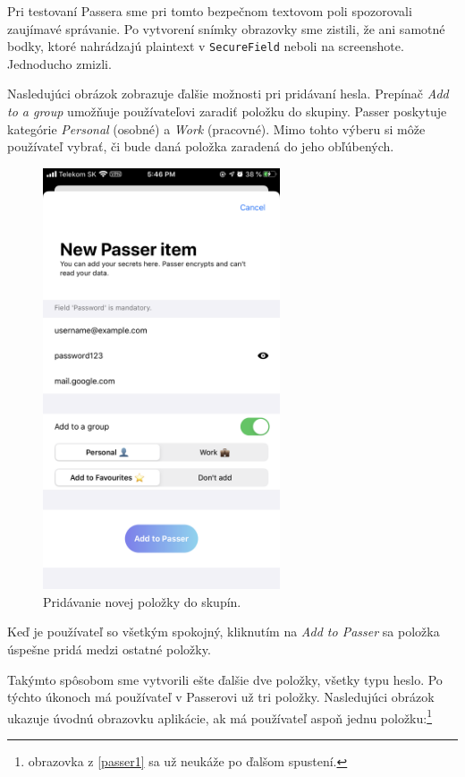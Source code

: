 Pri testovaní Passera sme pri tomto bezpečnom textovom poli spozorovali zaujímavé správanie. Po vytvorení snímky obrazovky sme zistili, že ani samotné bodky, ktoré nahrádzajú plaintext v \texttt{SecureField} neboli na screenshote. Jednoducho zmizli.

Nasledujúci obrázok zobrazuje ďalšie možnosti pri pridávaní hesla. Prepínač \textit{Add to a group} umožňuje používateľovi zaradiť položku do skupiny. Passer poskytuje kategórie \textit{Personal} (osobné) a \textit{Work} (pracovné). Mimo tohto výberu si môže používateľ vybrať, či bude daná položka zaradená do jeho obľúbených. 

\begin{figure}[H]
  \centering
  \includegraphics[width=7cm]{img/passer3.PNG}
  \caption{Pridávanie novej položky do skupín.}
  \label{passer3}
\end{figure}

Keď je používateľ so všetkým spokojný, kliknutím na \textit{Add to Passer} sa položka úspešne pridá medzi ostatné položky.

Takýmto spôsobom sme vytvorili ešte ďalšie dve položky, všetky typu heslo. Po týchto úkonoch má používateľ v Passerovi už tri položky. Nasledujúci obrázok ukazuje úvodnú obrazovku aplikácie, ak má používateľ aspoň jednu položku:\footnote{obrazovka z \figurename{ \ref{passer1}} sa už neukáže po ďalšom spustení.} 

